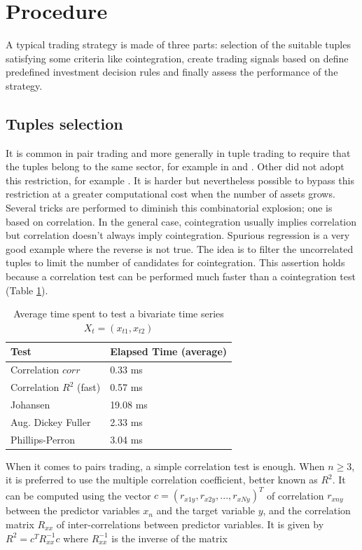 \documentclass[11pt,a4,twosided,singlespacing,titlepagenumber=on]{scrreprt}
\numberwithin{equation}{chapter} %
\theoremstyle{remark}
\begin{document}
\section{Procedure}
A typical trading strategy is made of three parts: selection of the suitable tuples satisfying some criteria like cointegration, create trading signals based on define predefined investment decision rules and finally assess the performance of the strategy.

\subsection{Tuples selection}
It is common in pair trading and more generally in tuple trading to require that the tuples belong to the same sector, for example in \cite{chan2009} and \cite{dunis2010}. Other did not adopt this restriction, for example \cite{caldeira2013}. It is harder but nevertheless possible to bypass this restriction at a greater computational cost when the number of assets grows. Several tricks are performed to diminish this combinatorial explosion; one is based on correlation. In the general case, cointegration usually implies correlation but correlation doesn't always imply cointegration. Spurious regression is a very good example where the reverse is not true. The idea is to filter the uncorrelated tuples to limit the number of candidates for cointegration. This assertion holds because a correlation test can be performed much faster than a cointegration test (Table \ref{time_spent_test_bivariate}).

\begin{table}[H]
\centering
\begin{tabular}{ll}
\hline
\multicolumn{1}{|l|}{Test}     & \multicolumn{1}{l|}{Elapsed Time (average)} \\ \hline
Correlation $corr$						 &  0.33 ms \\
Correlation $R^2$ (fast)       &  0.57 ms \\
Johansen                       &  19.08 ms\\
Aug. Dickey Fuller             &  2.33 ms\\
Phillips-Perron                &  3.04 ms\\
\hline
\end{tabular}
\caption{Average time spent to test a bivariate time series $X_t = (x_{t1}, x_{t2})$}
\label{time_spent_test_bivariate}
\end{table}


When it comes to pairs trading, a simple correlation test is enough. When $n \geq 3$, it is preferred to use the multiple correlation coefficient, better known as $R^2$. It can be computed using the vector $c = (r_{x1y}, r_{x2y},...,r_{xNy})^T$ of correlation $r_{xny}$ between the predictor variables $x_n$ and the target variable $y$, and the correlation matrix $R_{xx}$ of inter-correlations between predictor variables. It is given by $R^2 = c^T R_{xx}^{-1}c$ where $R_{xx}^{-1}$ is the inverse of the matrix
\end{document}
